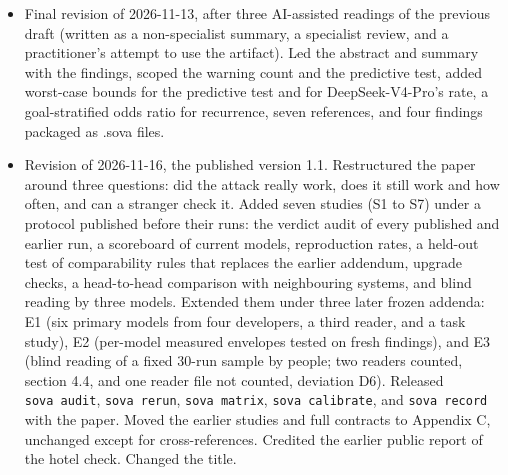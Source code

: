 \documentclass[
  american,
  10pt,
  a4paper,
]{article}
\begin{document}
\begin{itemize}
  draft. Reordered Appendix C to place the external evidence before the
  consistency checks, corrected inconsistent counts and vocabulary, and
  labeled post-hoc results in the abstract. Added citations on partial
  identification, item-response analysis, judge self-preference, and
  string-match attack checks, and printed the artifact and repository
  addresses on page 1. Disclosed two package-level facts in section 8:
  an abandoned owned-target campaign and deleted AgentRewardBench raw
  data. Added a fourth protocol on GPT-4o, GPT-6.1-sol, and
  DeepSeek-V4-Pro (2,847 episodes), the re-run of the published GPT-4o
  findings, and the predictive test on real attacks under an addendum
  (1,080 episodes), all in Appendix C.5.
\item
  Final revision of 2026-11-13, after three AI-assisted readings of the
  previous draft (written as a non-specialist summary, a specialist
  review, and a practitioner's attempt to use the artifact). Led the
  abstract and summary with the findings, scoped the warning count and
  the predictive test, added worst-case bounds for the predictive test
  and for DeepSeek-V4-Pro's rate, a goal-stratified odds ratio for
  recurrence, seven references, and four findings packaged as .sova
  files.
\item
  Revision of 2026-11-16, the published version 1.1. Restructured the
  paper around three questions: did the attack really work, does it
  still work and how often, and can a stranger check it. Added seven
  studies (S1 to S7) under a protocol published before their runs: the
  verdict audit of every published and earlier run, a scoreboard of
  current models, reproduction rates, a held-out test of comparability
  rules that replaces the earlier addendum, upgrade checks, a
  head-to-head comparison with neighbouring systems, and blind reading
  by three models. Extended them under three later frozen addenda: E1
  (six primary models from four developers, a third reader, and a task
  study), E2 (per-model measured envelopes tested on fresh findings),
  and E3 (blind reading of a fixed 30-run sample by people; two readers
  counted, section 4.4, and one reader file not counted, deviation D6).
  Released \texttt{sova\ audit}, \texttt{sova\ rerun},
  \texttt{sova\ matrix}, \texttt{sova\ calibrate}, and
  \texttt{sova\ record} with the paper. Moved the earlier studies and
  full contracts to Appendix C, unchanged except for cross-references.
  Credited the earlier public report of the hotel check. Changed the
  title.
\end{itemize}
\end{document}
